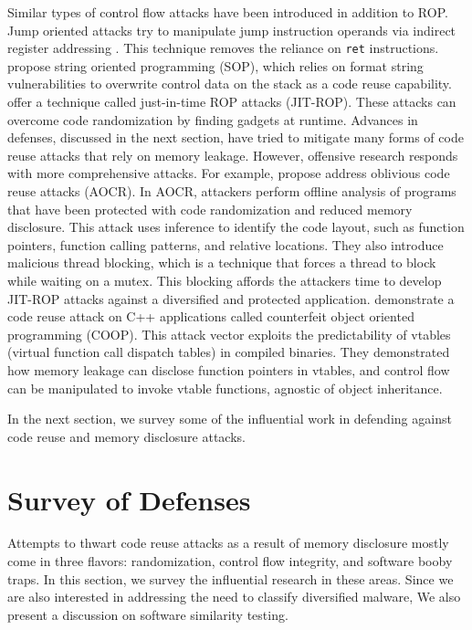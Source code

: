 \documentclass[preprint,12pt]{elsarticle}
\begin{document}
Similar types of control flow attacks have been introduced in addition to ROP. Jump oriented attacks try to manipulate jump instruction operands via indirect register addressing \cite{bletsch2011jump}. This technique removes the reliance on \texttt{ret} instructions. \cite{payer2013string} propose string oriented programming (SOP), which relies on format string vulnerabilities to overwrite control data on the stack as a code reuse capability. \cite{snow2013just} offer a technique called just-in-time ROP attacks (JIT-ROP). These attacks can overcome code randomization by finding gadgets at runtime. Advances in defenses, discussed in the next section, have tried to mitigate many forms of code reuse attacks that rely on memory leakage. However, offensive research responds with more comprehensive attacks. For example, \cite{rudd2017address} propose address oblivious code reuse attacks (AOCR). In AOCR, attackers perform offline analysis of programs that have been protected with code randomization and reduced memory disclosure. This attack uses inference to identify the code layout, such as function pointers, function calling patterns, and relative locations. They also introduce malicious thread blocking, which is a technique that forces a thread to block while waiting on a mutex. This blocking affords the attackers time to develop JIT-ROP attacks against a diversified and protected application. \cite{schuster2015counterfeit} demonstrate a code reuse attack on C++ applications called counterfeit object oriented programming (COOP). This attack vector exploits the predictability of vtables (virtual function call dispatch tables) in compiled binaries. They demonstrated how memory leakage can disclose function pointers in vtables, and control flow can be manipulated to invoke vtable functions, agnostic of object inheritance.

In the next section, we survey some of the influential work in defending against code reuse and memory disclosure attacks.

\section{Survey of Defenses}
\label{S:4}

Attempts to thwart code reuse attacks as a result of memory disclosure mostly come in three flavors: randomization, control flow integrity, and software booby traps. In this section, we survey the influential research in these areas. Since we are also interested in addressing the need to classify diversified malware, We also present a discussion on software similarity testing.
\end{document}

